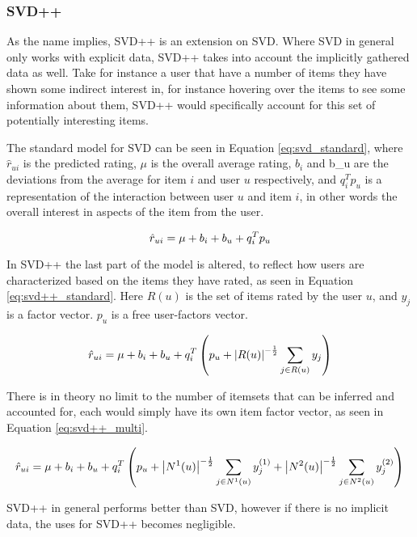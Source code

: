 \subsubsection{SVD++} \label{bg:mf_svd++}
As the name implies, SVD++ is an extension on SVD. Where SVD in general only works with explicit data, SVD++ takes into account the implicitly gathered data as well. Take for instance a user that have a number of items they have shown some indirect interest in, for instance hovering over the items to see some information about them, SVD++ would specifically account for this set of potentially interesting items.


 
The standard model for SVD can be seen in Equation \ref{eq:svd_standard}, where $\hat{r}_{ui}$ is the predicted rating, $\mu$ is the overall average rating, $b_{i}$ and b_{u} are the deviations from the average for item $i$ and user $u$ respectively, and $q_{i}^{T}p_{u}$ is a representation of the interaction between user $u$ and item $i$, in other words the overall interest in aspects of the item from the user.

\begin{equation} \label{eq:svd_standard}
\centering
\hat{r}_{ui} = \mu + b_{i} + b_{u} + q_{i}^{T}p_{u}
\end{equation}

In SVD++ the last part of the model is altered, to reflect how users are characterized based on the items they have rated, as seen in Equation \ref{eq:svd++_standard}. Here $R(u)$ is the set of items rated by the user $u$, and $y_{j}$ is a factor vector. $p_{u}$ is a free user-factors vector.

\begin{equation} \label{eq:svd++_standard}
\centering
\hat{r}_{ui} = \mu + b_{i} + b_{u} + q_{i}^{T}\left (p_{u} + \left | R(u) \right |^{-\frac{1}{2}} \sum_{j\in R(u)} y_{j} \right )
\end{equation}

There is in theory no limit to the number of itemsets that can be inferred and accounted for, each would simply have its own item factor vector, as seen in Equation \ref{eq:svd++_multi}.

\begin{equation} \label{eq:svd++_multi}
\centering
\hat{r}_{ui} = \mu + b_{i} + b_{u} + q_{i}^{T}\left (p_{u} + \left | N^{1}(u) \right |^{-\frac{1}{2}} \sum_{j\in N^{1}(u)} y_{j}^{(1)} + \left | N^{2}(u) \right |^{-\frac{1}{2}} \sum_{j\in N^{2}(u)} y_{j}^{(2)} \right )
\end{equation}

SVD++ in general performs better than SVD, however if there is no implicit data, the uses for SVD++ becomes negligible.